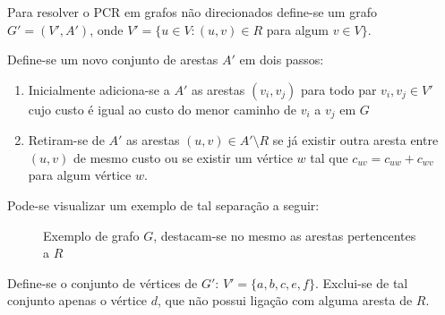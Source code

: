         Para resolver o PCR em grafos não direcionados define-se um grafo $G' = (V', A')$, onde $V' = \{ u \in V : (u, v) \in R$ para algum $v \in V\}$.

        Define-se um novo conjunto de arestas $A'$ em dois passos:
        
        \begin{enumerate}
            \item Inicialmente adiciona-se a $A'$ as arestas $(v_i, v_j)$ para todo par $v_i, v_j \in V'$ cujo custo é igual ao custo do menor caminho de $v_i$ a $v_j$ em $G$
            \item Retiram-se de $A'$ as arestas $(u, v) \in A' \setminus R$ se já existir outra aresta entre $(u, v)$ de mesmo custo ou se existir um vértice $w$ tal que $c_{uv} = c_{uw} + c_{wv}$ para algum vértice $w$.
        \end{enumerate}

        Pode-se visualizar um exemplo de tal separação a seguir:

        \begin{figure}[H]
            \centering
            \caption{Exemplo de grafo $G$, destacam-se no mesmo as arestas pertencentes a $R$}
            \label{grafo-original}
        \end{figure}

        Define-se o conjunto de vértices de $G'$: $V' = \{a, b, c, e, f\}$.
        Exclui-se de tal conjunto apenas o vértice $d$, que não possui ligação com alguma aresta de $R$.

